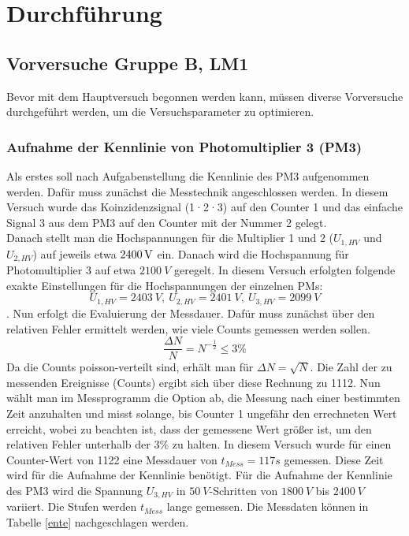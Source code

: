 \section{Durchführung}
    \subsection{Vorversuche Gruppe B, LM1}
        Bevor mit dem Hauptversuch begonnen werden kann, müssen diverse Vorversuche durchgeführt werden, um die Versuchsparameter zu optimieren.
        \subsubsection{Aufnahme der Kennlinie von Photomultiplier 3 (PM3)}
            Als erstes soll nach Aufgabenstellung die Kennlinie des PM3 aufgenommen werden. Dafür muss zunächst die Messtechnik angeschlossen werden. In diesem Versuch wurde das Koinzidenzsignal (1·2·3) auf den Counter 1 und das einfache Signal 3 aus dem PM3 auf den Counter mit der Nummer 2 gelegt.\\
            Danach stellt man die Hochspannungen für die Multiplier 1 und 2 ($U_{1,HV}$ und $U_{2,HV}$) auf jeweils etwa $\unit[2400]{V}$ ein. Danach wird die Hochspannung für Photomultiplier 3 auf etwa $2100\ \unit{V}$ geregelt. In diesem Versuch erfolgten folgende exakte Einstellungen für die Hochspannungen der einzelnen PMs: $$U_{1,HV} = 2403\ \unit{V},\ U_{2,HV} = 2401\ \unit{V},\ U_{3,HV} = 2099\ \unit{V}$$. 
            Nun erfolgt die Evaluierung der Messdauer. Dafür muss zunächst über den relativen Fehler ermittelt werden, wie viele Counts gemessen werden sollen. 
            $$ \frac{\Delta N}{N} = N^{-\frac{1}{2}} \leq 3\unit{\%}$$
            Da die Counts poisson-verteilt sind, erhält man für $\Delta N = \sqrt{N}$. Die Zahl der zu messenden Ereignisse (Counts) ergibt sich über diese Rechnung zu 1112. Nun wählt man im Messprogramm die Option ab, die Messung nach einer bestimmten Zeit anzuhalten und misst solange, bis Counter 1 ungefähr den errechneten Wert erreicht, wobei zu beachten ist, dass der gemessene Wert größer ist, um den relativen Fehler unterhalb der $3\unit{\%}$ zu halten. In diesem Versuch wurde für einen Counter-Wert von 1122 eine Messdauer von $t_{Mess} = 117\unit{s}$ gemessen. Diese Zeit wird für die Aufnahme der Kennlinie benötigt.
            Für die Aufnahme der Kennlinie des PM3 wird die Spannung $U_{3,HV}$ in $50\ \unit{V}$-Schritten von $1800\ \unit{V}$ bis $2400\ \unit{V}$ variiert. Die Stufen werden $t_{Mess}$ lange gemessen. Die Messdaten können in Tabelle \ref{ente} nachgeschlagen werden. 
